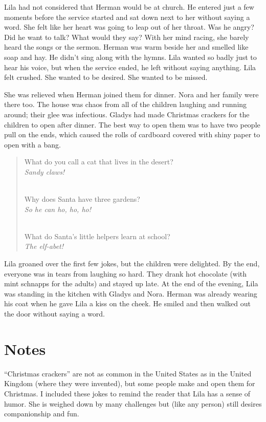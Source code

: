 \documentclass[
  american,
  letterpaper,
]{book}
\begin{document}
Lila had not considered that Herman would be at church. He entered just
a few moments before the service started and sat down next to her
without saying a word. She felt like her heart was going to leap out of
her throat. Was he angry? Did he want to talk? What would they say? With
her mind racing, she barely heard the songs or the sermon. Herman was
warm beside her and smelled like soap and hay. He didn't sing along with
the hymns. Lila wanted so badly just to hear his voice, but when the
service ended, he left without saying anything. Lila felt crushed. She
wanted to be desired. She wanted to be missed.

She was relieved when Herman joined them for dinner. Nora and her family
were there too. The house was chaos from all of the children laughing
and running around; their glee was infectious. Gladys had made Christmas
crackers for the children to open after dinner. The best way to open
them was to have two people pull on the ends, which caused the rolls of
cardboard covered with shiny paper to open with a bang.

\begin{quote}
What do you call a cat that lives in the desert?\\
\emph{Sandy claws!}\\
\strut \\
Why does Santa have three gardens?\\
\emph{So he can ho, ho, ho!}\\
\strut \\
What do Santa's little helpers learn at school?\\
\emph{The elf-abet!}
\end{quote}

Lila groaned over the first few jokes, but the children were delighted.
By the end, everyone was in tears from laughing so hard. They drank hot
chocolate (with mint schnapps for the adults) and stayed up late. At the
end of the evening, Lila was standing in the kitchen with Gladys and
Nora. Herman was already wearing his coat when he gave Lila a kiss on
the cheek. He smiled and then walked out the door without saying a word.

\section{Notes}\label{notes-52}

``Christmas crackers'' are not as common in the United States as in the
United Kingdom (where they were invented), but some people make and open
them for Christmas. I included these jokes to remind the reader that
Lila has a sense of humor. She is weighed down by many challenges but
(like any person) still desires companionship and fun.
\end{document}
